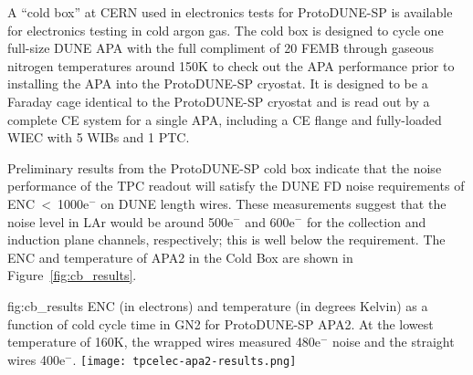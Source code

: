 A ``cold box'' at CERN used in electronics tests for ProtoDUNE-SP is available for electronics testing in cold argon gas. The cold box is designed to cycle one full-size DUNE APA with the full compliment of 20 FEMB through gaseous nitrogen temperatures around 150K to check out the APA performance prior to installing the APA into the ProtoDUNE-SP cryostat. It is designed to be a Faraday cage identical to the ProtoDUNE-SP cryostat and is read out by a complete CE system for a single APA, including a CE flange and fully-loaded WIEC with 5 WIBs and 1 PTC.

Preliminary results from the ProtoDUNE-SP cold box indicate that
the noise performance of the TPC readout will satisfy the DUNE FD noise requirements of
ENC~<~1000e$^-$ on DUNE length wires. These measurements suggest that the noise level in
LAr would be around 500e$^-$ and 600e$^-$ for the collection and induction plane channels,
respectively; this is well below the requirement.  The ENC and temperature of APA2 in the
Cold Box are shown in Figure~\ref{fig:cb_results}.

\begin{dunefigure}
{fig:cb_results}
{ENC (in electrons) and temperature (in degrees Kelvin) as a function of cold cycle time in GN2 for ProtoDUNE-SP APA2. At the lowest temperature of 160K, the wrapped wires measured 480e$^-$ noise and the straight wires 400e$^-$.}
\texttt{[image: tpcelec-apa2-results.png]}
\end{dunefigure}
